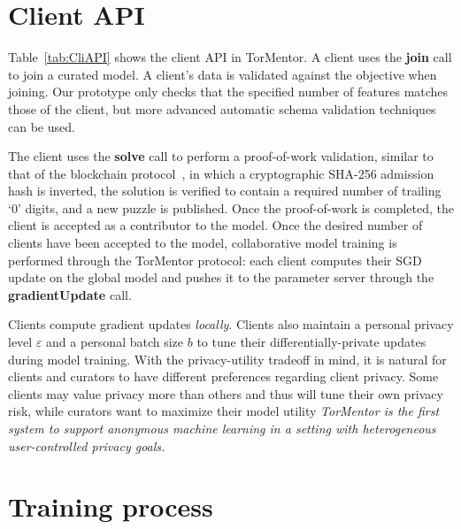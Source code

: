 \section{Client API} 

Table~\ref{tab:CliAPI} shows the client API in TorMentor. 
A client uses the \textbf{join} call to join a curated model. A
client's data is validated against the objective when joining. Our
prototype only checks that the specified number of features matches
those of the client, but more advanced automatic schema validation
techniques~\cite{Rahm:2001} can be used.

The client uses the \textbf{solve} call to perform a proof-of-work
validation, similar to that of the blockchain 
protocol~\cite{Nakamoto:2009}, in which a cryptographic SHA-256
admission hash is inverted, the solution is verified to contain
a required number of trailing `0' digits, and a new puzzle is
published. Once the proof-of-work is completed, the client is accepted
as a contributor to the model. Once the desired number of clients have
been accepted to the model, collaborative model training is performed
through the TorMentor protocol: each client computes their SGD update
on the global model and pushes it to the parameter server through the 
\textbf{gradientUpdate} call.

Clients compute gradient updates \emph{locally}. Clients also
maintain a personal privacy level $\varepsilon$ and a personal batch
size $b$ to tune their differentially-private updates during model
training. With the privacy-utility tradeoff in mind, it is natural for
clients and curators to have different preferences regarding client
privacy. Some clients may value privacy more than others and thus will
tune their own privacy risk, while curators want to maximize their
model utility \emph{TorMentor is the first system to support anonymous
machine learning in a setting with heterogeneous user-controlled
privacy goals.}

\section{Training process}
\label{sec:training}

